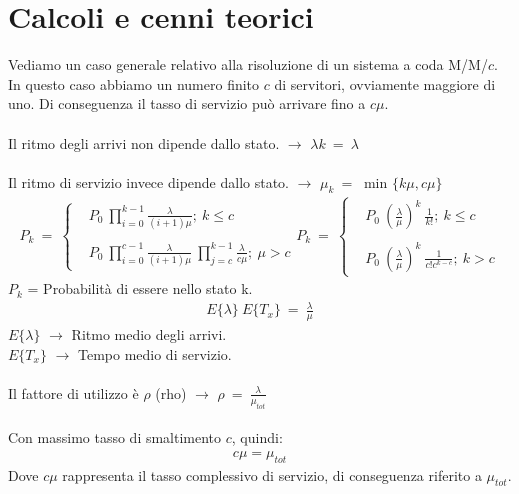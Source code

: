 \documentclass[12pt,a4paper]{article}
\begin{document}
\section{Calcoli e cenni teorici}
Vediamo un caso generale relativo alla risoluzione di un sistema a coda M/M/$c$. In questo caso abbiamo un numero finito $c$ di servitori, ovviamente maggiore di uno. Di conseguenza il tasso di servizio può arrivare fino a $c\mu$. \\ \\
    Il ritmo degli arrivi non dipende dallo stato. $\rightarrow$ $\lambda k \ = \ \lambda$ \\ \\ 
    Il ritmo di servizio invece dipende dallo stato. $\rightarrow$ $\mu_{k} \ = \ $ min $ \{k\mu , c\mu\}$ \\ 
    \begin{align*}
    P_{k} \ = \
    \begin{cases}
     &P_{0} \ \prod_{i = 0}^{k - 1}\frac{\lambda}{(i + 1) \mu};\ k \le c\\ \\
     &P_{0} \ \prod_{i = 0}^{c - 1}\frac{\lambda}{(i + 1) \mu}\ \prod_{j = c}^{k - 1}\frac{\lambda}{c \mu}; \ \mu > c
     \end{cases}
    P_{k} \ = \
    \begin{cases}
     &P_{0} \ (\frac{\lambda}{\mu})^{k} \ \frac{1}{k!};\ k \le c\\ \\
     &P_{0} \ (\frac{\lambda}{\mu})^{k} \ \frac{1}{c!c^{k-c}}; \ k > c
    \end{cases}
    \end{align*} 
    $P_{k}$ = Probabilità di essere nello stato k.
    \begin{align*}
    E\{\lambda\} \ E\{T_{x}\} \ = \ \frac{\lambda}{\mu}
    \end{align*}
    $E\{\lambda\}$ $\rightarrow$ Ritmo medio degli arrivi. \\
    $E\{T_{x}\}$ $\rightarrow$ Tempo medio di servizio. \\ \\
    Il fattore di utilizzo è $\rho$ (rho) $\rightarrow$ $\rho \ = \ \frac{\lambda}{\mu_{tot}}$ \\ \\
    Con massimo tasso di smaltimento $c$, quindi:
    \begin{align*}
    c \mu = \mu_{tot}
    \end{align*}
    Dove $c\mu$ rappresenta il tasso complessivo di servizio, di conseguenza riferito a $\mu_{tot}$. \\
\end{document}
